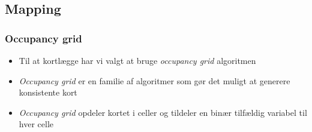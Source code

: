\subsection{Mapping}
\begin{frame}
\frametitle{Occupancy grid}
\begin{itemize}
\item Til at kortlægge har vi valgt at bruge \textit{occupancy grid} algoritmen
\item \textit{Occupancy grid} er en familie af algoritmer som gør det muligt at generere konsistente kort
\item \textit{Occupancy grid} opdeler kortet i celler og tildeler en binær tilfældig variabel til hver celle
\end{itemize}
\end{frame}